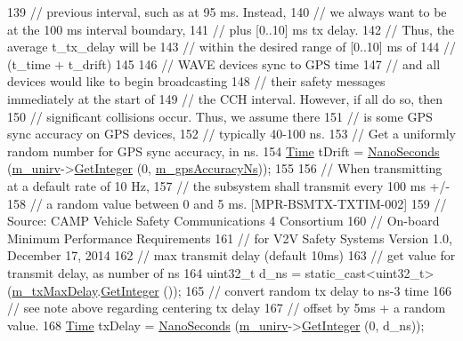 \begin{DoxyCode}
139   \textcolor{comment}{// previous interval, such as at 95 ms.  Instead,}
140   \textcolor{comment}{// we always want to be at the 100 ms interval boundary,}
141   \textcolor{comment}{// plus [0..10] ms tx delay.}
142   \textcolor{comment}{// Thus, the average t\_tx\_delay will be}
143   \textcolor{comment}{// within the desired range of [0..10] ms of}
144   \textcolor{comment}{// (t\_time + t\_drift)}
145 
146   \textcolor{comment}{// WAVE devices sync to GPS time}
147   \textcolor{comment}{// and all devices would like to begin broadcasting}
148   \textcolor{comment}{// their safety messages immediately at the start of}
149   \textcolor{comment}{// the CCH interval.  However, if all do so, then}
150   \textcolor{comment}{// significant collisions occur.  Thus, we assume there}
151   \textcolor{comment}{// is some GPS sync accuracy on GPS devices,}
152   \textcolor{comment}{// typically 40-100 ns.}
153   \textcolor{comment}{// Get a uniformly random number for GPS sync accuracy, in ns.}
154   \hyperlink{namespacens3_1_1TracedValueCallback_a7ffd3e7c142ffe7c8a1d2db9b8de38ec}{Time} tDrift = \hyperlink{group__timecivil_ga281d64bcb4dad96267d83c7688ec433f}{NanoSeconds} (\hyperlink{classns3_1_1BsmApplication_a8c6f7e06af51ef84b38358397b2d3cdc}{m\_unirv}->\hyperlink{classns3_1_1RandomVariableStream_a66cd94e6305ce7f000f1a9ff0fcb9aef}{GetInteger} (0, 
      \hyperlink{classns3_1_1BsmApplication_a4c66027982c4d715a89e568ce5424eca}{m\_gpsAccuracyNs}));
155 
156   \textcolor{comment}{// When transmitting at a default rate of 10 Hz,}
157   \textcolor{comment}{// the subsystem shall transmit every 100 ms +/-}
158   \textcolor{comment}{// a random value between 0 and 5 ms. [MPR-BSMTX-TXTIM-002]}
159   \textcolor{comment}{// Source: CAMP Vehicle Safety Communications 4 Consortium}
160   \textcolor{comment}{// On-board Minimum Performance Requirements}
161   \textcolor{comment}{// for V2V Safety Systems Version 1.0, December 17, 2014}
162   \textcolor{comment}{// max transmit delay (default 10ms)}
163   \textcolor{comment}{// get value for transmit delay, as number of ns}
164   uint32\_t d\_ns = \textcolor{keyword}{static\_cast<}uint32\_t\textcolor{keyword}{>} (\hyperlink{classns3_1_1BsmApplication_a30f0fb812b58a1bf98ec17129283dcb8}{m\_txMaxDelay}.\hyperlink{classns3_1_1Time_a8c88e10860be3bc0cfabdbd92df42cff}{GetInteger} ());
165   \textcolor{comment}{// convert random tx delay to ns-3 time}
166   \textcolor{comment}{// see note above regarding centering tx delay}
167   \textcolor{comment}{// offset by 5ms + a random value.}
168   \hyperlink{namespacens3_1_1TracedValueCallback_a7ffd3e7c142ffe7c8a1d2db9b8de38ec}{Time} txDelay = \hyperlink{group__timecivil_ga281d64bcb4dad96267d83c7688ec433f}{NanoSeconds} (\hyperlink{classns3_1_1BsmApplication_a8c6f7e06af51ef84b38358397b2d3cdc}{m\_unirv}->\hyperlink{classns3_1_1RandomVariableStream_a66cd94e6305ce7f000f1a9ff0fcb9aef}{GetInteger} (0, d\_ns));

\end{DoxyCode}
